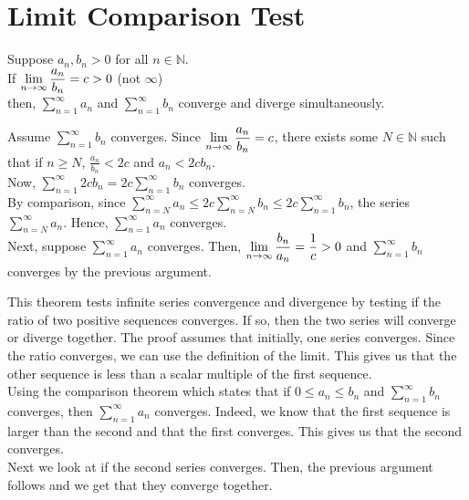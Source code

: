 \documentclass[12pt]{article}
\begin{document}
\section{Limit Comparison Test}
\begin{theo}{}
Suppose \(a_n, b_n > 0\) for all \(n \in \mathbb N\).\\
If \(\displaystyle\lim_{n\to\infty}\frac{a_n}{b_n} = c > 0\) (not \(\infty\))\\
then, \(\displaystyle\sum_{n=1}^\infty a_n\) and \(\displaystyle\sum_{n=1}^\infty b_n\) converge and diverge simultaneously.    
\end{theo}
\begin{prf}{}
Assume \(\displaystyle\sum_{n=1}^\infty b_n\) converges. Since \(\displaystyle\lim_{n\to\infty}\frac{a_n}{b_n} = c\), there exists some \(N \in \mathbb N\) such that if \(n \ge N\),  \(\frac{a_n}{b_n} < 2c\) and \(a_n < 2cb_n\).\\
Now, \(\displaystyle\sum_{n=1}^\infty 2cb_n = 2c\displaystyle\sum_{n=1}^\infty b_n\) converges.\\
By comparison, since \(\displaystyle\sum_{n=N}^\infty a_n \le 2c\displaystyle\sum_{n=N}^\infty b_n \le 2c\displaystyle\sum_{n=1}^\infty b_n\), the series \(\displaystyle\sum_{n=N}^\infty a_n\). Hence, \(\displaystyle\sum_{n=1}^\infty a_n\) converges.\\
Next, suppose \(\displaystyle\sum_{n=1}^\infty a_n\) converges. Then, \(\displaystyle\lim_{n\to\infty}\frac{b_n}{a_n} = \frac{1}{c} > 0\) and \(\displaystyle\sum_{n=1}^\infty b_n\) converges by the previous argument.
\end{prf}
\begin{explanation}{}
    This theorem tests infinite series convergence and divergence by testing if the ratio of two positive sequences converges. If so, then the two series will converge or diverge together. The proof assumes that initially, one series converges. Since the ratio converges, we can use the definition of the limit. This gives us that the other sequence is less than a scalar multiple of the first sequence.\\
Using the comparison theorem which states that if $0 \le a_n \le b_n$ and $\displaystyle\sum_{n=1}^\infty b_n$ converges, then $\displaystyle\sum_{n=1}^\infty a_n$ converges. Indeed, we know that the first sequence is larger than the second and that the first converges. This gives us that the second converges.\\
Next we look at if the second series converges. Then, the previous argument follows and we get that they converge together.\\
\end{explanation}
\end{document}
